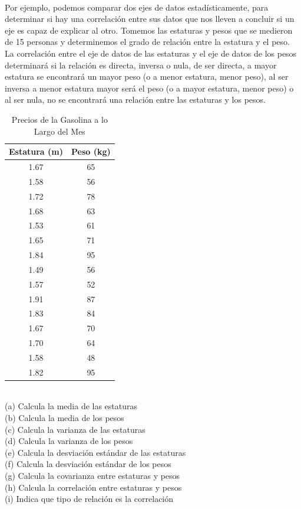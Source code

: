 \documentclass{article}
\begin{document}
\\[12pt]
Por ejemplo, podemos comparar dos ejes de datos estadísticamente, para determinar si hay una correlación entre sus datos que nos lleven a concluir si un eje es capaz de explicar al otro. Tomemos las estaturas y pesos que se medieron de 15 personas y determinemos el grado de relación entre la estatura y el peso. La correlación entre el eje de datos de las estaturas y el eje de datos de los pesos determinará si la relación es directa, inversa o nula, de ser directa, a mayor estatura se encontrará un mayor peso (o a menor estatura, menor peso), al ser inversa a menor estatura mayor será el peso (o a mayor estatura, menor peso) o al ser nula, no se encontrará una relación entre las estaturas y los pesos.
\begin{table}[ht]
    \centering
    \caption{Precios de la Gasolina a lo Largo del Mes}
    \begin{tabular}{|c|c|}
        \hline
        \textbf{Estatura (m)} & \textbf{Peso (kg)} \\
        \hline
        1.67 & 65 \\
        1.58 & 56 \\
        1.72 & 78 \\
        1.68 & 63 \\
        1.53 & 61 \\
        1.65 & 71 \\
        1.84 & 95 \\
        1.49 & 56 \\
        1.57 & 52 \\
        1.91 & 87 \\
        1.83 & 84 \\
        1.67 & 70 \\
        1.70 & 64 \\
        1.58 & 48 \\
        1.82 & 95 \\
        \hline
    \end{tabular}
\end{table}
\\
(a) Calcula la media de las estaturas
\\[6pt]
(b) Calcula la media de los pesos
\\[6pt]
(c) Calcula la varianza de las estaturas
\\[6pt]
(d) Calcula la varianza de los pesos
\\[6pt]
(e) Calcula la desviación estándar de las estaturas
\\[6pt]
(f) Calcula la desviación estándar de los pesos
\\[6pt]
(g) Calcula la covarianza entre estaturas y pesos
\\[6pt]
(h) Calcula la correlación entre estaturas y pesos
\\[6pt]
(i) Indica que tipo de relación es la correlación
\end{document}
